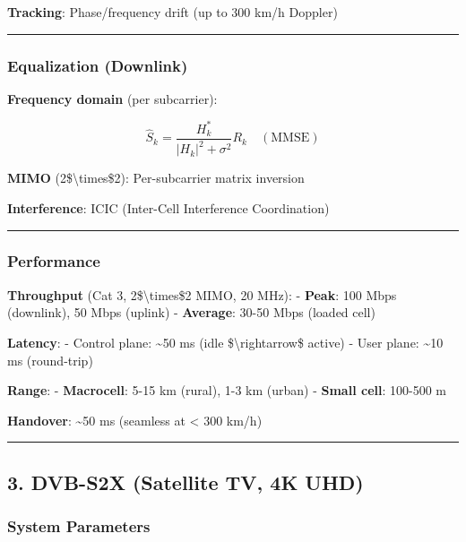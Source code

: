\textbf{Tracking}: Phase/frequency drift (up to 300 km/h Doppler)

\begin{center}\rule{0.5\linewidth}{0.5pt}\end{center}

\subsubsection{Equalization (Downlink)}\label{equalization-downlink}

\textbf{Frequency domain} (per subcarrier):

\[
\hat{S}_k = \frac{H_k^*}{|H_k|^2 + \sigma^2} R_k \quad (\text{MMSE})
\]

\textbf{MIMO} (2\$\textbackslash times\$2): Per-subcarrier matrix
inversion

\textbf{Interference}: ICIC (Inter-Cell Interference Coordination)

\begin{center}\rule{0.5\linewidth}{0.5pt}\end{center}

\subsubsection{Performance}\label{performance-1}

\textbf{Throughput} (Cat 3, 2\$\textbackslash times\$2 MIMO, 20 MHz): -
\textbf{Peak}: 100 Mbps (downlink), 50 Mbps (uplink) - \textbf{Average}:
30-50 Mbps (loaded cell)

\textbf{Latency}: - Control plane: \textasciitilde50 ms (idle
\$\textbackslash rightarrow\$ active) - User plane: \textasciitilde10 ms
(round-trip)

\textbf{Range}: - \textbf{Macrocell}: 5-15 km (rural), 1-3 km (urban) -
\textbf{Small cell}: 100-500 m

\textbf{Handover}: \textasciitilde50 ms (seamless at \textless{} 300
km/h)

\begin{center}\rule{0.5\linewidth}{0.5pt}\end{center}

\subsection{3. DVB-S2X (Satellite TV, 4K
UHD)}\label{dvb-s2x-satellite-tv-4k-uhd}

\subsubsection{System Parameters}\label{system-parameters-2}

